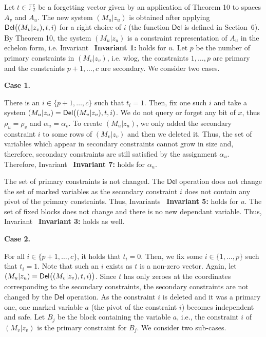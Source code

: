 Let $t\in\mathbb{F}_{2}^{c}$ be a forgetting vector given by an application of Theorem 10 to spaces $A_{v}$ and $A_{u}$.
The new system $(M_{u}|z_{u})$ is obtained after applying $\mathsf{Del}\bigl{(}(M_{v}|z_{v}),t,i)$ for a right choice of $i$ (the function $\mathsf{Del}$ is defined in Section 6).
By Theorem 10, the system $(M_{u}|z_{u})$ is a constraint representation of $A_{u}$ in the echelon form, i.e. Invariant \textbf{ Invariant 1:} holds for $u$.
Let $p$ be the number of primary constraints in $(M_{v}|z_{v})$, i.e. wlog, the constraints $1,\dots,p$ are primary and the constraints $p+1,\dots,c$ are secondary.
We consider two cases.\par




\par\medskip\noindent\textbf{Case 1.}\par




There is an $i\in\{p+1,\dots,c\}$ such that $t_{i}=1$.
Then, fix one such $i$ and take a system $(M_{u}|z_{u})=\mathsf{Del}\bigl{(}(M_{v}|z_{v}),t,i)$.
We do not query or forget any bit of $x$, thus $\rho_{u}=\rho_{v}$ and $\alpha_{u}=\alpha_{v}$.
To create $(M_{u}|z_{u})$, we only added the secondary constraint $i$ to some rows of $(M_{v}|z_{v})$ and then we deleted it.
Thus, the set of variables which appear in secondary constraints cannot grow in size and, therefore, secondary constraints are still satisfied by the assignment $\alpha_{u}$.
Therefore, Invariant \textbf{ Invariant 7:} holds for $\alpha_{u}$.\par




The set of primary constraints is not changed.
The $\mathsf{Del}$ operation does not change the set of marked variables as the secondary constraint $i$ does not contain any pivot of the primary constraints.
Thus, Invariants \textbf{ Invariant 5:} holds for $u$.
The set of fixed blocks does not change and there is no new dependant variable. Thus, Invariant \textbf{ Invariant 3:} holds as well.\par





\par\medskip\noindent\textbf{Case 2.}\par




For all $i\in\{p+1,\dots,c\}$, it holds that $t_{i}=0$.
Then, we fix some $i\in\{1,\dots,p\}$ such that $t_{i}=1$.
Note that such an $i$ exists as $t$ is a non-zero vector.
Again, let $(M_{u}|z_{u})=\mathsf{Del}\bigl{(}(M_{v}|z_{v}),t,i)\bigr{)}$.
Since $t$ has only zeroes at the coordinates corresponding to the secondary constraints, the secondary constraints are not changed by the $\mathsf{Del}$ operation.
As the constraint $i$ is deleted and it was a primary one, one marked variable $a$ (the pivot of the constraint $i$) becomes independent and safe.
Let $B_{j}$ be the block containing the variable $a$, i.e., the constraint $i$ of $(M_{v}|z_{v})$ is the primary constraint for $B_{j}$.
We consider two sub-cases.\par





